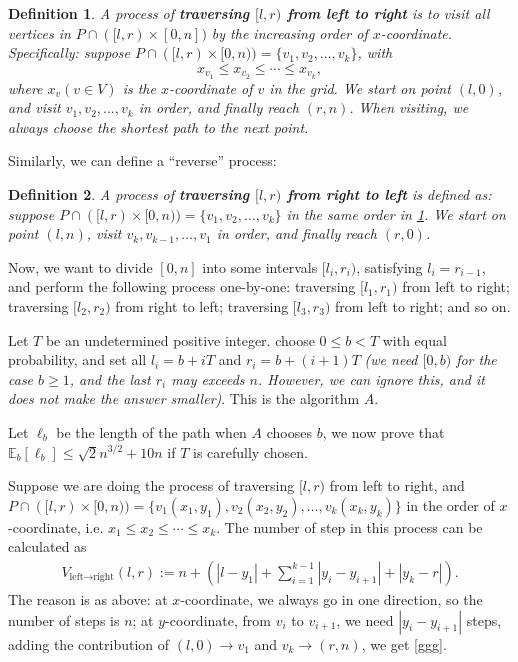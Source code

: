 \documentclass[11pt]{article}
\theoremstyle{plain}
\newtheorem{definition}{Definition}[section]
\begin{document}
\begin{definition}
    \label{def5.1}
A process of \textbf{traversing $[l,r)$ from left to right} is to visit all vertices in $P\cap ([l,r)\times [0,n])$ by the increasing order of $x$-coordinate. Specifically: suppose $P\cap ([l,r)\times [0,n))=\{v_1,v_2,\ldots,v_k\}$, with
$$x_{v_1}\le x_{v_2}\le \cdots\le x_{v_k},$$
where $x_{v}(v\in V)$ is the $x$-coordinate of $v$ in the grid. We start on point $(l,0)$, and visit $v_1,v_2,\ldots,v_k$ in order, and finally reach $(r,n)$. When visiting, we always choose the shortest path to the next point.
\end{definition}

Similarly, we can define a ``reverse'' process:
\begin{definition}
A process of \textbf{traversing $[l,r)$ from right to left} is defined as: suppose $P\cap ([l,r)\times [0,n))=\{v_1,v_2,\ldots,v_k\}$ in the same order in \ref{def5.1}. We start on point $(l,n)$, visit $v_k,v_{k-1},\ldots,v_1$ in order, and finally reach $(r,0)$.
\end{definition}

Now, we want to divide $[0,n]$ into some intervals $[l_i,r_i)$, satisfying $l_i=r_{i-1}$, and perform the following process one-by-one: traversing $[l_1,r_1)$ from left to right; traversing $[l_2,r_2)$ from right to left; traversing $[l_3,r_3)$ from left to right; and so on. 

Let $T$ be an undetermined positive integer.  choose $0\le b<T$ with equal probability, and set all $l_i=b+iT$ and $r_i=b+(i+1)T$ \textit{(we need $[0,b)$ for the case $b\ge 1$, and the last $r_i$ may exceeds $n$. However, we can ignore this, and it does not make the answer smaller)}. This is the algorithm $A$. 

Let $\ell_b$ be the length of the path when $A$ chooses $b$, we now prove that $\mathbb{E}_b[\ell_b]\le \sqrt{2}n^{3/2}+10n$ if $T$ is carefully chosen.

Suppose we are doing the process of traversing $[l,r)$ from left to right, and $P\cap ([l,r)\times [0,n))=\{v_1(x_1,y_1),v_2(x_2,y_2),\ldots,v_k(x_k,y_k)\}$ in the order of $x$-coordinate, i.e. $x_1\le x_2\le \cdots\le x_k$. The number of step in this process can be calculated as
\begin{align}
V_{\text{left}\to \text{right}}(l,r):=n+\left(|l-y_1|+\sum\limits_{i=1}^{k-1} |y_{i}-y_{i+1}|+|y_k-r|\right). \label{ggg}
\end{align}
The reason is as above: at $x$-coordinate, we always go in one direction, so the number of steps is $n$; at $y$-coordinate, from $v_i$ to $v_{i+1}$, we need $|y_i-y_{i+1}|$ steps, adding the contribution of $(l,0)\to v_1$ and $v_k\to (r,n)$, we get \eqref{ggg}.
\end{document}
